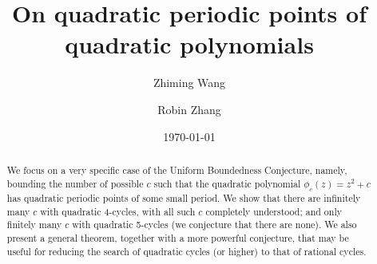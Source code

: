 

\title{On quadratic periodic points of quadratic polynomials}
\author{Zhiming Wang}
\author{Robin Zhang}
\date{\today}



\begin{abstract}
  We focus on a very specific case of the Uniform Boundedness
  Conjecture, namely, bounding the number of possible $c$ such that
  the quadratic polynomial $\phi_c(z) = z^2 + c$ has quadratic
  periodic points of some small period. We show that there are
  infinitely many $c$ with quadratic 4-cycles, with all such $c$
  completely understood; and only finitely many $c$ with quadratic
  5-cycles (we conjecture that there are none). We also present a
  general theorem, together with a more powerful conjecture, that may
  be useful for reducing the search of quadratic cycles (or higher) to
  that of rational cycles.
\end{abstract}

\maketitle

\tableofcontents













{}



